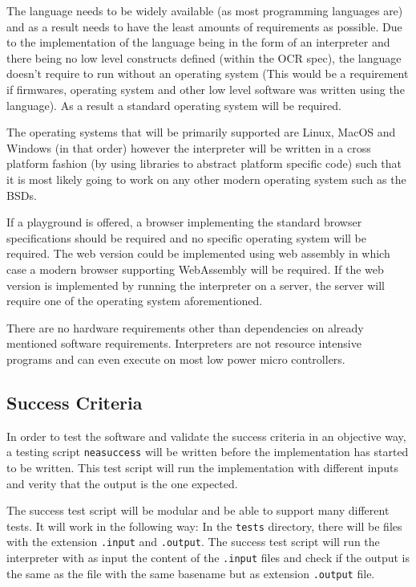 \documentclass{article}
\begin{document}
The language needs to be widely available (as most programming languages are)
and as a result needs to have the least amounts of requirements as possible.
Due to the implementation of the language being in the form of an interpreter
and there being no low level constructs defined (within the OCR spec), the
language doesn't require to run without an operating system (This would be a
requirement if firmwares, operating system and other low level software was
written using the language). As a result a standard operating system will be
required.

The operating systems that will be primarily supported are Linux, MacOS and
Windows (in that order) however the interpreter will be written in a cross
platform fashion (by using libraries to abstract platform specific code) such
that it is most likely going to work on any other modern operating system such
as the BSDs.

If a playground is offered, a browser implementing the standard browser
specifications should be required and no specific operating system will be
required. The web version could be implemented using web assembly in which case
a modern browser supporting WebAssembly will be required. If the web version is
implemented by running the interpreter on a server, the server will require one
of the operating system aforementioned.

There are no hardware requirements other than dependencies on already mentioned
software requirements. Interpreters are not resource intensive programs and can
even execute on most low power micro controllers\cite{micropython}.

\subsection{Success Criteria}

In order to test the software and validate the success criteria in an objective
way, a testing script \texttt{neasuccess} will be written before the
implementation has started to be written. This test script will run the
implementation with different inputs and verity that the output is the one
expected.

The success test script will be modular and be able to support many different
tests. It will work in the following way: In the \texttt{tests} directory,
there will be files with the extension \texttt{.input} and \texttt{.output}.
The success test script will run the interpreter with as input the content of
the \texttt{.input} files and check if the output is the same as the file with
the same basename but as extension \texttt{.output} file.
\end{document}

